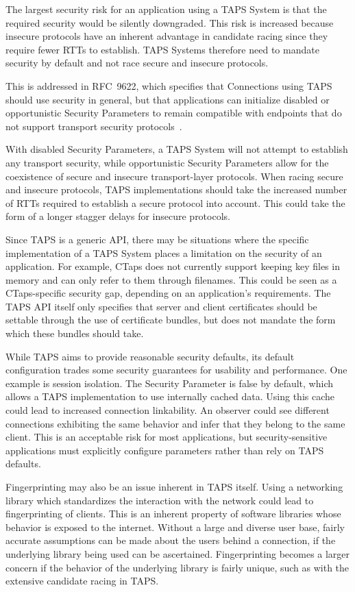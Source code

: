 The largest security risk for an application using a TAPS System is that
the required security would be silently downgraded. This risk is increased
because insecure protocols have an inherent advantage in candidate racing since they
require fewer RTTs to establish.
TAPS Systems therefore need to mandate security by default and not race
secure and insecure protocols.

This is addressed in RFC~9622, which specifies that Connections
using TAPS should use security in general, but that applications
can initialize disabled or opportunistic Security Parameters
to remain compatible with endpoints that do not support transport
security protocols~\cite[sec.~6.3]{rfc9622}.

With disabled Security Parameters, a TAPS System will not attempt
to establish any transport security, while opportunistic Security Parameters
allow for the coexistence of secure and insecure transport-layer protocols.
When racing secure and insecure protocols, TAPS implementations
should take the increased number of RTTs required to establish a secure protocol
into account. This could take the form of a longer stagger delays for insecure
protocols.

Since TAPS is a generic API,
there may be situations where the specific implementation of a TAPS System
places a limitation on the security of an application.
For example, CTaps does not currently support keeping key
files in memory and can only refer to them through filenames. This could be
seen as a CTaps-specific security gap, depending on an application's requirements.
The TAPS API itself only specifies that server and client certificates should be settable through the use of
certificate bundles, but does not mandate the form which these bundles should take.

While TAPS aims to provide reasonable security defaults,
its default configuration trades some security guarantees 
for usability and performance. One example is session isolation.
The  Security Parameter is false by default,
which allows a TAPS implementation
to use internally cached data.
Using this cache could lead to increased connection linkability. 
An observer could see
different connections exhibiting the same behavior
and infer that they belong to the same client. This is an acceptable risk
for most applications, but security-sensitive applications
must explicitly configure parameters rather than rely on TAPS
defaults.

Fingerprinting may also be an issue inherent in TAPS itself.
Using a networking library which standardizes the interaction
with the network could lead to fingerprinting
of clients. This is an inherent property of software libraries whose behavior is exposed to the internet.
Without a large and diverse user base, fairly accurate assumptions can
be made about the users behind a connection, if the underlying library being
used can be ascertained. Fingerprinting becomes a larger concern if the behavior
of the underlying library is fairly unique, such as with the extensive
candidate racing in TAPS.
